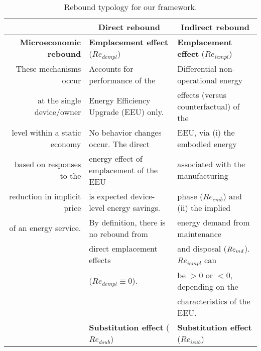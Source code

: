


\begin{table}
\footnotesize
\begin{center}
\caption{Rebound typology for our framework.}
\label{tab:rebound_typology}
\begin{tabular}{ r l l }
\toprule
                                   & \multicolumn{1}{c}{\textbf{Direct rebound}}  & \multicolumn{1}{c}{\textbf{Indirect rebound}} \\
\midrule
\textbf{Microeconomic rebound}     & \textbf{Emplacement effect} ($Re_{dempl}$)   & \textbf{Emplacement effect} ($Re_{iempl}$) \\
These mechanisms occur             & Accounts for performance of the              & Differential non-operational energy  \\
at the single device/owner         & Energy Efficiency Upgrade (EEU) only.        & effects (versus counterfactual) of the  \\
level within a static economy      & No behavior changes occur. The direct        & EEU, via (i) the embodied energy  \\
based on responses to the          & energy effect of emplacement of the EEU      & associated with the manufacturing  \\
reduction in implicit price        & is expected device-level energy savings.     & phase ($Re_{emb}$) and (ii) the implied  \\
of an energy service.              & By definition, there is no rebound from      & energy demand from maintenance   \\
                                   & direct emplacement effects                   & and disposal ($Re_{md}$). $Re_{iempl}$ can  \\
                                   & ($Re_{dempl} \equiv 0$).                     & be $> 0$ or $< 0$, depending on the   \\
                                   &                                              & characteristics of the EEU.        \\
                                   \cmidrule{2-3}
                                   & \textbf{Substitution effect} ($Re_{dsub}$)   & \textbf{Substitution effect} ($Re_{isub}$) \\

\end{tabular}
\end{center}
\end{table}
